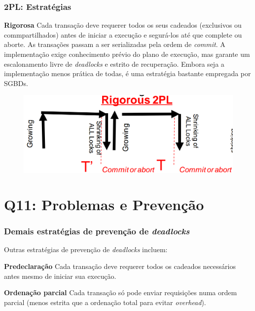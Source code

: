 \documentclass{beamer}
\begin{document}
\begin{frame}
    \frametitle{2PL: Estratégias}
    \begin{block}{\textbf{Rigorosa}}
        Cada transação deve requerer todos os seus cadeados (exclusivos ou commpartilhados) antes de iniciar a execução e segurá-los até que complete ou aborte. As transações passam a ser serializadas pela ordem de \emph{commit}. A implementação exige conhecimento prévio do plano de execução, mas garante um escalonamento livre de \emph{deadlocks} e estrito de recuperação. Embora seja a implementação menos prática de todas, é uma estratégia bastante empregada por SGBDs.

        \medskip
        \begin{figure}
            \includegraphics[width=0.8\linewidth]{rigorous2pl.png}
        \end{figure}
    \end{block}
\end{frame}

\section{Q11: Problemas e Prevenção}


\begin{frame}
    \frametitle{Demais estratégias de prevenção de \emph{deadlocks}}
    Outras estratégias de prevenção de \emph{deadlocks} incluem:

    \medskip
    \begin{block}{\textbf{Predeclaração}}
        Cada transação deve requerer todos os cadeados necessários antes mesmo de iniciar sua execução.
    \end{block}

    \medskip
    \begin{block}{\textbf{Ordenação parcial}}
        Cada transação só pode enviar requisições numa ordem parcial (menos estrita que a ordenação total para evitar \emph{overhead}).
    \end{block}
\end{frame}
\end{document}
